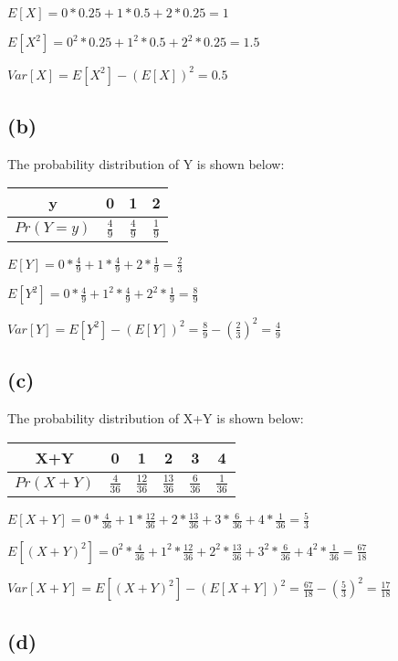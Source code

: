 \documentclass[12pt]{article}
\begin{document}
\begin{spacing}{2.0}
$E[X]=0*0.25 +1*0.5 +2*0.25= 1$

$E[X^2]= 0^2*0.25 +1^2*0.5 +2^2*0.25= 1.5$

$Var[X]= E[X^2]- (E[X])^2= 0.5$

\subsection*{(b)}

The probability distribution of Y is shown below:

\begin{tabular}{|c|c|c|c|}
  \hline
  y & 0 & 1 & 2 \\
  \hline
  $Pr(Y=y)$ & $\frac{4}{9}$ & $\frac{4}{9}$ & $\frac{1}{9}$ \\
  \hline
\end{tabular}

$E[Y]= 0*\frac{4}{9} +1*\frac{4}{9} +2*\frac{1}{9}= \frac{2}{3}$

$E[Y^2]= 0*\frac{4}{9} +1^2*\frac{4}{9} +2^2*\frac{1}{9}= \frac{8}{9}$

$Var[Y]= E[Y^2]- (E[Y])^2= \frac{8}{9}- \left(\frac{2}{3}\right)^2 = \frac{4}{9}$

\subsection*{(c)}

The probability distribution of X+Y is shown below:

\begin{tabular}{|c|c|c|c|c|c|}
  \hline
  X+Y & 0 & 1 & 2 & 3 & 4 \\
  \hline
  $Pr(X+Y)$ & $\frac{4}{36}$ & $\frac{12}{36}$ & $\frac{13}{36}$ & $\frac{6}{36}$ & $\frac{1}{36}$ \\
  \hline
\end{tabular}

$E[X+Y]= 0*\frac{4}{36} +1*\frac{12}{36}+ 2*\frac{13}{36} +3*\frac{6}{36} +4*\frac{1}{36}= \frac{5}{3}$

$E[(X+Y)^2]=0^2*\frac{4}{36} +1^2*\frac{12}{36}+ 2^2*\frac{13}{36} +3^2*\frac{6}{36} +4^2*\frac{1}{36}= \frac{67}{18}$

$Var[X+Y]= E[(X+Y)^2]- (E[X+Y])^2= \frac{67}{18} - \left(\frac{5}{3} \right)^2=  \frac{17}{18}$

\subsection*{(d)}


\end{spacing}
\end{document}
